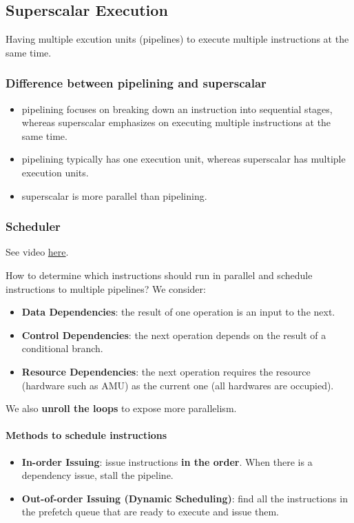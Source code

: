 \documentclass{../../ainote}
\begin{document}
\subsection{Superscalar Execution}
Having multiple excution units (pipelines) to execute multiple instructions at the same time.

\subsubsection{Difference between pipelining and superscalar}
\begin{itemize}[leftmargin=*]
    \item pipelining focuses on breaking down an instruction into sequential stages, whereas superscalar emphasizes on executing multiple instructions at the same time.
    \item pipelining typically has one execution unit, whereas superscalar has multiple execution units.
    \item superscalar is more parallel than pipelining.
\end{itemize}

\subsubsection{Scheduler}
See video \href{https://youtu.be/uhi2BA9bl5A?si=mk9CfAYbRhP9ArV5&t=850}{here}.

How to determine which instructions should run in parallel and schedule instructions to multiple pipelines? We consider:
\begin{itemize}
    \item \textbf{Data Dependencies}: the result of one operation is an input to the next.
    \item \textbf{Control Dependencies}: the next operation depends on the result of a conditional branch.
    \item \textbf{Resource Dependencies}: the next operation requires the resource (hardware such as AMU) as the current one (all hardwares are occupied).
\end{itemize}

We also \textbf{unroll the loops} to expose more parallelism.

\paragraph{Methods to schedule instructions}\mbox\\
\begin{itemize}
    \item \textbf{In-order Issuing}: issue instructions \textbf{in the order}. When there is a dependency issue, stall the pipeline.
    \item \textbf{Out-of-order Issuing (Dynamic Scheduling)}: find all the instructions in the prefetch queue that are ready to execute and issue them.
\end{itemize}
\end{document}
